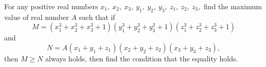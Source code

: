 For any positive real numbers $x_1,\ x_2,\ x_3,\ y_1,\ y_2,\ y_3,\ z_1,\ z_2,\ z_3,$ find the maximum value of real number $A$ such that if \[ M = (x_1^3+x_2^3+x_3^3+1)(y_1^3+y_2^3+y_3^3+1)(z_1^3+z_2^3+z_3^3+1)  \] and \[ N = A(x_1+y_1+z_1)(x_2+y_2+z_2)(x_3+y_3+z_3),  \] then $M \geq N$ always holds, then find the condition that the equality holds.